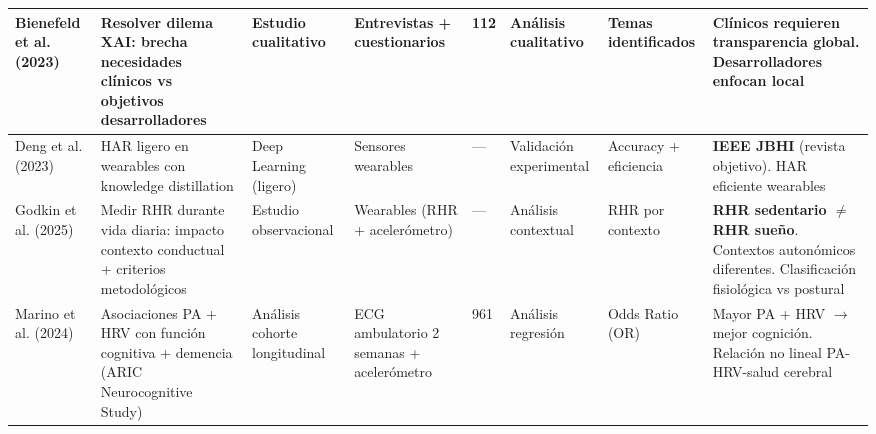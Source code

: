 \begin{table}[htbp]
\begin{tabular}{@{}p{1.8cm}p{2.2cm}p{1.5cm}p{1.3cm}p{0.8cm}p{1.2cm}p{1.8cm}p{1.5cm}@{}}
        \midrule
        
        
        Bienefeld et al. (2023) \cite{Bienefeld2023XAI} & 
        Resolver dilema XAI: brecha necesidades clínicos vs objetivos desarrolladores & 
        Estudio cualitativo & 
        Entrevistas + cuestionarios & 
        112 & 
        Análisis cualitativo & 
        Temas identificados & 
        Clínicos requieren transparencia global. Desarrolladores enfocan local \\
        
        \midrule
        
        Deng et al. (2023) \cite{Deng2023LharJBHI} & 
        HAR ligero en wearables con knowledge distillation & 
        Deep Learning (ligero) & 
        Sensores wearables & 
        --- & 
        Validación experimental & 
        Accuracy + eficiencia & 
        \textbf{IEEE JBHI} (revista objetivo). HAR eficiente wearables \\
        
        \midrule
        
        
        Godkin et al. (2025) \cite{Godkin2025Context} & 
        Medir RHR durante vida diaria: impacto contexto conductual + criterios metodológicos & 
        Estudio observacional & 
        Wearables (RHR + acelerómetro) & 
        --- & 
        Análisis contextual & 
        RHR por contexto & 
        \textbf{RHR sedentario $\neq$ RHR sueño}. Contextos autonómicos diferentes. Clasificación fisiológica vs postural \\
        
        \midrule
        
        Marino et al. (2024) \cite{Marino2024ARIC} & 
        Asociaciones PA + HRV con función cognitiva + demencia (ARIC Neurocognitive Study) & 
        Análisis cohorte longitudinal & 
        ECG ambulatorio 2 semanas + acelerómetro & 
        961 & 
        Análisis regresión & 
        Odds Ratio (OR) & 
        Mayor PA + HRV $\rightarrow$ mejor cognición. Relación no lineal PA-HRV-salud cerebral \\
        
        \midrule
        
        

\end{tabular}
\end{table}
